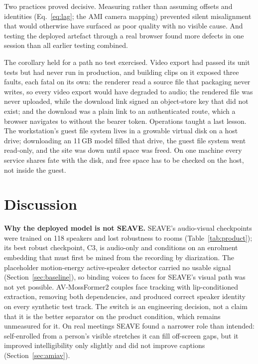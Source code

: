 \documentclass[conference]{IEEEtran}
\begin{document}
Two practices proved decisive. Measuring rather than assuming offsets and identities (Eq.~\eqref{eq:lag}; the AMI camera mapping) prevented silent misalignment that would otherwise have surfaced as poor quality with no visible cause. And testing the deployed artefact through a real browser found more defects in one session than all earlier testing combined.

The corollary held for a path no test exercised. Video export had passed its unit tests but had never run in production, and building clips on it exposed three faults, each fatal on its own: the renderer read a source file that packaging never writes, so every video export would have degraded to audio; the rendered file was never uploaded, while the download link signed an object-store key that did not exist; and the download was a plain link to an authenticated route, which a browser navigates to without the bearer token. Operations taught a last lesson. The workstation's guest file system lives in a growable virtual disk on a host drive; downloading an 11\,GB model filled that drive, the guest file system went read-only, and the site was down until space was freed. On one machine every service shares fate with the disk, and free space has to be checked on the host, not inside the guest.

\section{Discussion}
\label{sec:discussion}

\textbf{Why the deployed model is not SEAVE.} SEAVE's audio-visual checkpoints were trained on 118 speakers and lost robustness to rooms (Table~\ref{tab:product}); its best robust checkpoint, C3, is audio-only and conditions on an enrolment embedding that must first be mined from the recording by diarization. The placeholder motion-energy active-speaker detector carried no usable signal (Section~\ref{sec:baseline}), so binding voices to faces for SEAVE's visual path was not yet possible. AV-MossFormer2 couples face tracking with lip-conditioned extraction, removing both dependencies, and produced correct speaker identity on every synthetic test track. The switch is an engineering decision, not a claim that it is the better separator on the product condition, which remains unmeasured for it. On real meetings SEAVE found a narrower role than intended: self-enrolled from a person's visible stretches it can fill off-screen gaps, but it improved intelligibility only slightly and did not improve captions (Section~\ref{sec:amiav}).
\end{document}
